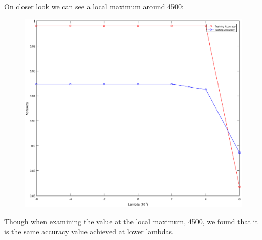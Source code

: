 \documentclass{article}
\begin{document}
On closer look we can see a local maximum around 4500:

	
	\begin{figure}[h!]
		\begin{center} 
			\includegraphics[scale=0.4]{lambda_accuracy.eps} 
		\end{center}  
		\label{fig:M6}
	\end{figure}

Though when examining the value at the local maximum, 4500, we found that it is the same accuracy value achieved at lower lambdas.


	
	
\end{document}
